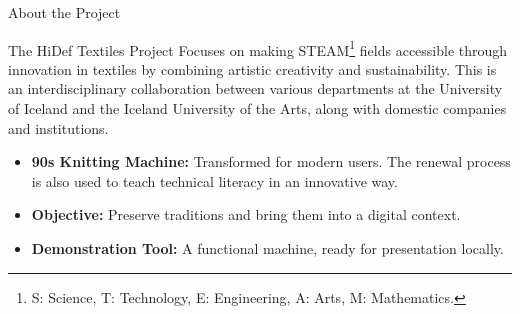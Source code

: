 \documentclass[
    NAME={Dr. Helga Ingimundardóttir},
    EMAIL={helgaingim@hi.is},
    FACULTY={Industrial Engineering},
    TITLE={HiDef Textiles: Reviving Tradition with Innovation},
    SUBTITLE={Empowering Creativity and Sustainability in Textile Production through Digital Transformation},
    SEMINAR={Reykjavík DataBeers},
    DATE={January 25, 2025},
    WIDE={true}
]{HI-LaTeX/hi-beamer}
\begin{document}
\begin{frame}{About the Project}

\begin{block}{The HiDef Textiles Project}
Focuses on making STEAM\footnote{S: Science, T: Technology, E: Engineering, A: Arts, M: Mathematics.} fields accessible through innovation in textiles by combining artistic creativity and sustainability. This is an interdisciplinary collaboration between various departments at the \alert{University of Iceland} and the \alert{Iceland University of the Arts}, along with domestic companies and institutions.
\end{block}

\begin{itemize}
    \item \textbf{90s Knitting Machine:} Transformed for modern users. The renewal process is also used to teach technical literacy in an innovative way.
    \item \textbf{Objective:} Preserve traditions and bring them into a digital context.
    \item \textbf{Demonstration Tool:} A functional machine, ready for presentation locally.
\end{itemize}

\end{frame}
\end{document}
